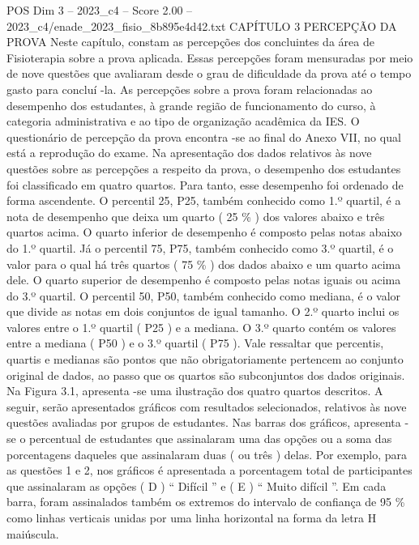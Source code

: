 \begin{textsample}{POS Dim 3 – 2023\_c4 – Score 2.00 – 2023\_c4/enade\_2023\_fisio\_8b895e4d42.txt}  \label{ex:f3_pos_096}
CAPÍTULO 3 PERCEPÇÃO DA PROVA Neste capítulo, constam as percepções dos concluintes da área de Fisioterapia sobre a prova aplicada.
Essas percepções foram mensuradas por meio de nove questões que avaliaram desde o grau de dificuldade da prova até o tempo gasto para concluí -la.
As percepções sobre a prova foram relacionadas ao desempenho dos estudantes, à grande região de funcionamento do curso, à categoria administrativa e ao tipo de organização acadêmica da IES.
O questionário de percepção da prova encontra -se ao final do Anexo VII, no qual está a reprodução do exame.
Na apresentação dos dados relativos às nove questões sobre as percepções a respeito da prova, o desempenho dos estudantes foi classificado em quatro quartos.
Para tanto, esse desempenho foi ordenado de forma ascendente.
O percentil 25, P25, também conhecido como 1.º quartil, é a nota de desempenho que deixa um quarto ( 25 \% ) dos valores abaixo e três quartos acima.
O quarto inferior de desempenho é composto pelas notas abaixo do 1.º quartil.
Já o percentil 75, P75, também conhecido como 3.º quartil, é o valor para o qual há três quartos ( 75 \% ) dos dados abaixo e um quarto acima dele.
O quarto superior de desempenho é composto pelas notas iguais ou acima do 3.º quartil.
O percentil 50, P50, também conhecido como mediana, é o valor que divide as notas em dois conjuntos de igual tamanho.
O 2.º quarto inclui os valores entre o 1.º quartil ( P25 ) e a mediana.
O 3.º quarto contém os valores entre a mediana ( P50 ) e o 3.º quartil ( P75 ).
Vale ressaltar que percentis, quartis e medianas são pontos que não obrigatoriamente pertencem ao conjunto original de dados, ao passo que os quartos são subconjuntos dos dados originais.
Na Figura 3.1, apresenta -se uma ilustração dos quatro quartos descritos.
A seguir, serão apresentados gráficos com resultados selecionados, relativos às nove questões avaliadas por grupos de estudantes.
Nas barras dos gráficos, apresenta -se o percentual de estudantes que assinalaram uma das opções ou a soma das porcentagens daqueles que assinalaram duas ( ou três ) delas.
Por exemplo, para as questões 1 e 2, nos gráficos é apresentada a porcentagem total de participantes que assinalaram as opções ( D ) “ Difícil ” e ( E ) “ Muito difícil ”.
Em cada barra, foram assinalados também os extremos do intervalo de confiança de 95 \% como linhas verticais unidas por uma linha horizontal na forma da letra H maiúscula.

\end{textsample}
